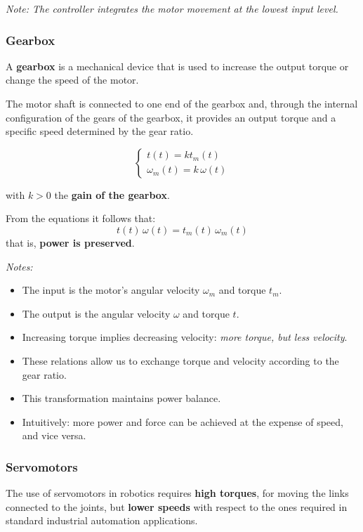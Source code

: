 \textit{Note: The controller integrates the motor movement at the lowest input level.}

\hfill

\subsubsection*{Gearbox}

A \textbf{gearbox} is a mechanical device that is used to increase the output torque or change the speed of the motor.  

The motor shaft is connected to one end of the gearbox and, through the internal configuration of the gears of the gearbox, it provides an output torque and a specific speed determined by the gear ratio.  

\[
\begin{cases}
t(t) = k t_m(t) \\
\omega_m(t) = k \, \omega(t)
\end{cases}
\]

with $k > 0$ the \textbf{gain of the gearbox}.  

From the equations it follows that:
\[
t(t)\,\omega(t) = t_m(t)\,\omega_m(t)
\]
that is, \textbf{power is preserved}.  

\textit{Notes:}  
\begin{itemize}
    \item The input is the motor’s angular velocity $\omega_m$ and torque $t_m$.  
    \item The output is the angular velocity $\omega$ and torque $t$.  
    \item Increasing torque implies decreasing velocity: \textit{more torque, but less velocity}.  
    \item These relations allow us to exchange torque and velocity according to the gear ratio.  
    \item This transformation maintains power balance.  
    \item Intuitively: more power and force can be achieved at the expense of speed, and vice versa.  
\end{itemize}

\hfill

\subsubsection*{Servomotors}

The use of servomotors in robotics requires \textbf{high torques}, for moving the links connected to the joints, but \textbf{lower speeds} with respect to the ones required in standard industrial automation applications.  

